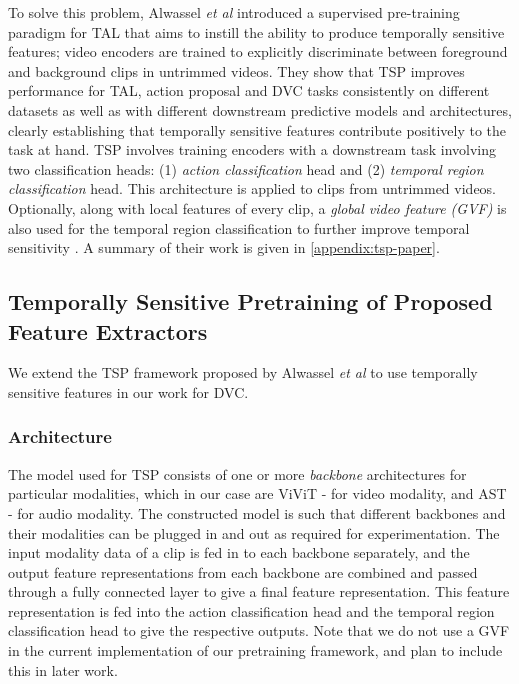 \par To solve this problem, Alwassel \textit{et al} introduced a supervised pre-training paradigm for TAL that aims to instill the ability to produce temporally sensitive features; video encoders are trained to explicitly discriminate between foreground and background clips in untrimmed videos. They show that TSP improves performance for TAL, action proposal and DVC tasks consistently on different datasets as well as with different downstream predictive models and architectures, clearly establishing that temporally sensitive features contribute positively to the task at hand. TSP involves training encoders with a downstream task involving two classification heads: (1) \textit{action classification} head and (2) \textit{temporal region classification} head. This architecture is applied to clips from untrimmed videos. Optionally, along with local features of every clip, a \textit{global video feature (GVF)} is also used for the temporal region classification to further improve temporal sensitivity \cite{alwassel2021tsp}. A summary of their work is given in \ref{appendix:tsp-paper}.


\subsection{Temporally Sensitive Pretraining of Proposed Feature Extractors}

\par We extend the TSP framework proposed by Alwassel \textit{et al} \cite{alwassel2021tsp} to use temporally sensitive features in our work for DVC.

\subsubsection{Architecture} The model used for TSP consists of one or more \textit{backbone} architectures for particular modalities, which in our case are ViViT - for video modality, and AST - for audio modality. The constructed model is such that different backbones and their modalities can be plugged in and out as required for experimentation. The input modality data of a clip is fed in to each backbone separately, and the output feature representations from each backbone are combined and passed through a fully connected layer to give a final feature representation. This feature representation is fed into the action classification head and the temporal region classification head to give the respective outputs. Note that we do not use a GVF in the current implementation of our pretraining framework, and plan to include this in later work.

